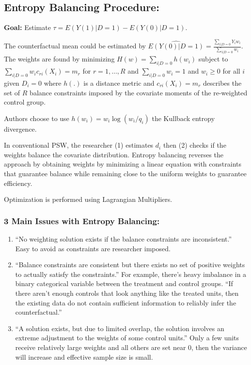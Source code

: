 \documentclass[
  letterpaper,
  DIV=11,
  numbers=noendperiod]{scrartcl}
\providecommand{\tightlist}{%
  \setlength{\itemsep}{0pt}\setlength{\parskip}{0pt}}\usepackage{longtable,booktabs,array}
\begin{document}
\hypertarget{entropy-balancing-procedure}{%
\subsection{Entropy Balancing
Procedure:}\label{entropy-balancing-procedure}}

\textbf{Goal:} Estimate \(\tau = E(Y(1) |D=1) - E(Y(0) | D=1).\)

The counterfactual mean could be estimated by
\(\widehat{E(Y(0)|D=1)}=\frac{\sum_{i|D=0} Y_i w_i}{\sum_{i|D=0} w_i}.\)
The weights are found by minimizing \(H(w) = \sum_{i|D=0} h(w_i)\)
subject to \(\sum_{i|D=0} w_i c_{ri}(X_i) = m_r\) for \(r =1,…,R\) and
\(\sum_{i|D=0} w_i = 1\) and \(w_i \geq 0\) for all \(i\) given
\(D_i = 0\) where \(h(.)\) is a distance metric and \(c_{ri}(X_i)=m_r\)
describes the set of \(R\) balance constraints imposed by the covariate
moments of the re-weighted control group.

Authors choose to use \(h(w_i)=w_i\log(w_i/q_i)\) the Kullback entropy
divergence.

In conventional PSW, the researcher (1) estimates \(d_i\) then (2)
checks if the weights balance the covariate distribution. Entropy
balancing reverses the approach by obtaining weights by minimizing a
linear equation with constraints that guarantee balance while remaining
close to the uniform weights to guarantee efficiency.

Optimization is performed using Lagrangian Multipliers.

\hypertarget{main-issues-with-entropy-balancing}{%
\subsubsection{3 Main Issues with Entropy
Balancing:}\label{main-issues-with-entropy-balancing}}

\begin{enumerate}
\def\labelenumi{\arabic{enumi}.}
\tightlist
\item
  ``No weighting solution exists if the balance constraints are
  inconsistent.'' Easy to avoid as constraints are researcher imposed.
\item
  ``Balance constraints are consistent but there exists no set of
  positive weights to actually satisfy the constraints.'' For example,
  there's heavy imbalance in a binary categorical variable between the
  treatment and control groups. ``If there aren't enough controls that
  look anything like the treated units, then the existing data do not
  contain sufficient information to reliably infer the counterfactual.''
\item
  ``A solution exists, but due to limited overlap, the solution involves
  an extreme adjustment to the weights of some control units.'' Only a
  few units receive relatively large weights and all others are set near
  0, then the variance will increase and effective sample size is small.
\end{enumerate}
\end{document}
